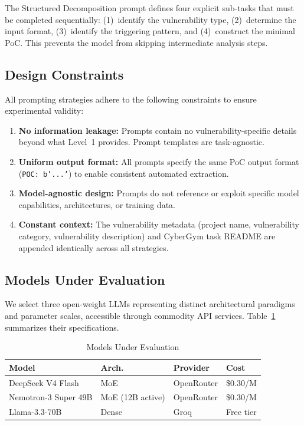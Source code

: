 \documentclass{ieeeaccess}
\begin{document}
The Structured Decomposition prompt defines four explicit sub-tasks that must be completed sequentially: (1)~identify the vulnerability type, (2)~determine the input format, (3)~identify the triggering pattern, and (4)~construct the minimal PoC. This prevents the model from skipping intermediate analysis steps.

\subsection{Design Constraints}

All prompting strategies adhere to the following constraints to ensure experimental validity:

\begin{enumerate}
    \item \textbf{No information leakage:} Prompts contain no vulnerability-specific details beyond what Level~1 provides. Prompt templates are task-agnostic.
    \item \textbf{Uniform output format:} All prompts specify the same PoC output format (\texttt{POC: b'...'}) to enable consistent automated extraction.
    \item \textbf{Model-agnostic design:} Prompts do not reference or exploit specific model capabilities, architectures, or training data.
    \item \textbf{Constant context:} The vulnerability metadata (project name, vulnerability category, vulnerability description) and CyberGym task README are appended identically across all strategies.
\end{enumerate}

\subsection{Models Under Evaluation}
\label{sec:models}

We select three open-weight LLMs representing distinct architectural paradigms and parameter scales, accessible through commodity API services. Table~\ref{tab:models} summarizes their specifications.

\begin{table}[t]
\caption{Models Under Evaluation}
\label{tab:models}
\centering
\begin{tabular}{p{2.5cm}p{1.5cm}p{1.5cm}p{1.5cm}}
\toprule
\textbf{Model} & \textbf{Arch.} & \textbf{Provider} & \textbf{Cost} \\
\midrule
DeepSeek V4 Flash & MoE & OpenRouter & \$0.30/M \\
Nemotron-3 Super 49B & MoE (12B active) & OpenRouter & \$0.30/M \\
Llama-3.3-70B & Dense & Groq & Free tier \\
\bottomrule
\end{tabular}
\end{table}
\end{document}
